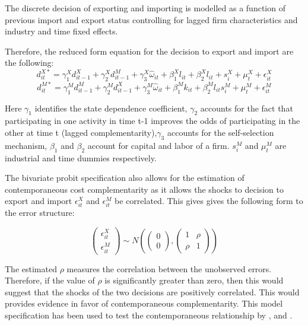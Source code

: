 \documentclass[12pt]{article}
\begin{document}
The discrete decision of exporting and importing is modelled as a function of previous import and
export status controlling for lagged firm characteristics and industry and time fixed
effects. 

Therefore, the reduced form equation for the decision to export and
import are the following: 
\begin{equation}
d_{it}^{X*} = \gamma_{1}^{X} d_{it-1}^{X} + \gamma_{2}^{X} d_{it-1}^{M}+
\gamma_{3}^{X} \hat{\omega}_{it}  + \beta_{1}^{X}l_{it}  +\beta_{2}^{X}l_{it}+
s_{i}^{X} + \mu_{t}^{X}  + \epsilon_{it}^{X}
\end{equation}
\begin{equation}
d_{it}^{M*} = \gamma_{1}^{M} d_{it-1}^{M} + \gamma_{2}^{M} d_{it-1}^{X}+
\gamma_{3}^{M} \hat{\omega}_{it}  + \beta_{1}^{M}k_{it}  +\beta_{2}^{M}l_{it}
s_{i}^{M} + \mu_{t}^{M}  + \epsilon_{it}^{M}
\end{equation}

Here $\gamma_{1}$ identifies the state dependence coefficient, $\gamma_{2}$ accounts for
the fact that participating in one activity in time t-1 improves the
odds of participating in the other at time t (lagged complementarity),$\gamma_{3}$ accounts for
the self-selection mechanism, $\beta_{1}$ and $\beta_{2}$ account for
capital and labor of a firm.  $s_{i}^{M}$  and $\mu_{t}^{M}$ are industrial
and time dummies respectively.

The bivariate probit specification also allows for the estimation of 
contemporaneous cost complementarity as it allows the shocks to
decision to export and import 
$\epsilon_{it}^{X}$ and $\epsilon_{it}^{M}$  be
correlated. This gives gives the following form to the error
structure: 


\[\begin{pmatrix}
\epsilon_{it}^{X} \\
\epsilon_{it}^{M}
\end{pmatrix}\sim N\left(\begin{pmatrix}
0 \\
0
\end{pmatrix},\begin{pmatrix}
1 & \rho \\
\rho & 1
\end{pmatrix}\right)
\]


The estimated $\rho$ measures the correlation between the unobserved
errors. Therefore, if the value of $\rho$ is significantly greater than
zero,  then this would suggest that the shocks of the two decisions
are positively correlated. This would provides evidence in favor 
of contemporaneous complementarity.  
This model specification has been used to test the contemporaneous relationship
by \textcite{aristei2013firms}, \textcite{aw2007export} and \textcite{manez2015dynamic}. 
\end{document}
